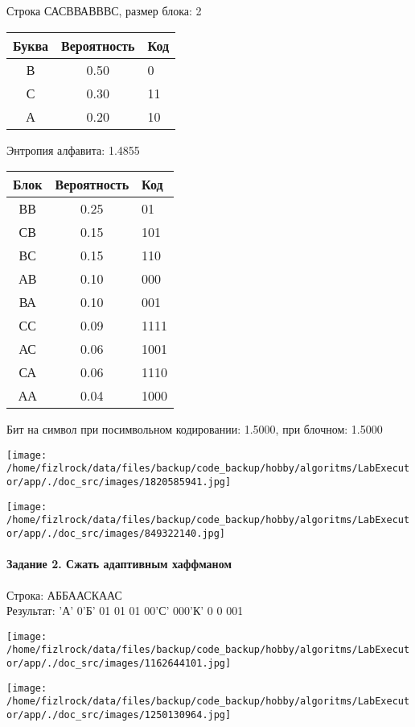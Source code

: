 \documentclass[a4paper, 12pt]{article}
\begin{document}
Строка САСВВАВВВС, размер блока: 2
\begin{center}
 \begin{tabular}{ |c|c|l| } 
  \hline
     Буква & Вероятность & Код\\ \hline
В & 0.50 & 0\\\hline
С & 0.30 & 11\\\hline
А & 0.20 & 10
\\ \hline \end{tabular}
\end{center}
Энтропия алфавита: 1.4855
\begin{center}
 \begin{tabular}{ |c|c|l| } 
  \hline
     Блок & Вероятность & Код\\ \hline
ВВ & 0.25 & 01\\\hline
СВ & 0.15 & 101\\\hline
ВС & 0.15 & 110\\\hline
АВ & 0.10 & 000\\\hline
ВА & 0.10 & 001\\\hline
СС & 0.09 & 1111\\\hline
АС & 0.06 & 1001\\\hline
СА & 0.06 & 1110\\\hline
АА & 0.04 & 1000
\\ \hline \end{tabular}
\end{center}
Бит на символ при посимвольном кодировании: 1.5000, при блочном: 1.5000

\texttt{[image: /home/fizlrock/data/files/backup/code\_backup/hobby/algoritms/LabExecutor/app/./doc\_src/images/1820585941.jpg]}

\texttt{[image: /home/fizlrock/data/files/backup/code\_backup/hobby/algoritms/LabExecutor/app/./doc\_src/images/849322140.jpg]}
\pagebreak
\paragraph{Задание 2. Сжать адаптивным хаффманом\\}

Строка: 
АББААСКААС\\
Результат: 'А' 0'Б' 01 01 01 00'С' 000'К' 0 0 001

\texttt{[image: /home/fizlrock/data/files/backup/code\_backup/hobby/algoritms/LabExecutor/app/./doc\_src/images/1162644101.jpg]}

\texttt{[image: /home/fizlrock/data/files/backup/code\_backup/hobby/algoritms/LabExecutor/app/./doc\_src/images/1250130964.jpg]}
\end{document}
